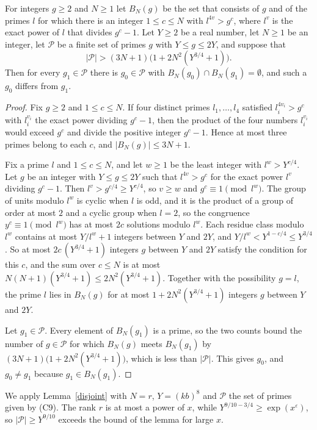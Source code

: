 \begin{lemma}\label{disjoint}
For integers $g\ge2$ and $N\ge1$ let $B_N(g)$ be the set that consists of $g$ and of the primes $l$ for which there is an integer $1\le c\le N$ with $l^{4v}>g^{c}$, where $l^{v}$ is the exact power of $l$ that divides $g^{c}-1$. Let $Y\ge2$ be a real number, let $N\ge1$ be an integer, let $\mathcal P$ be a finite set of primes $g$ with $Y\le g\le2Y$, and suppose that
\[
\lvert\mathcal P\rvert>(3N+1)\big(1+2N^2(Y^{3/4}+1)\big).
\]
Then for every $g_1\in\mathcal P$ there is $g_0\in\mathcal P$ with $B_N(g_0)\cap B_N(g_1)=\emptyset$, and such a $g_0$ differs from $g_1$.
\end{lemma}

\begin{proof}
Fix $g\ge2$ and $1\le c\le N$. If four distinct primes $l_1,\dots,l_4$ satisfied $l_i^{4v_i}>g^{c}$ with $l_i^{v_i}$ the exact power dividing $g^{c}-1$, then the product of the four numbers $l_i^{v_i}$ would exceed $g^{c}$ and divide the positive integer $g^{c}-1$. Hence at most three primes belong to each $c$, and $\lvert B_N(g)\rvert\le3N+1$.

Fix a prime $l$ and $1\le c\le N$, and let $w\ge1$ be the least integer with $l^{w}>Y^{c/4}$. Let $g$ be an integer with $Y\le g\le2Y$ such that $l^{4v}>g^{c}$ for the exact power $l^{v}$ dividing $g^{c}-1$. Then $l^{v}>g^{c/4}\ge Y^{c/4}$, so $v\ge w$ and $g^{c}\equiv1\pmod{l^{w}}$. The group of units modulo $l^{w}$ is cyclic when $l$ is odd, and it is the product of a group of order at most $2$ and a cyclic group when $l=2$, so the congruence $y^{c}\equiv1\pmod{l^{w}}$ has at most $2c$ solutions modulo $l^{w}$. Each residue class modulo $l^{w}$ contains at most $Y/l^{w}+1$ integers between $Y$ and $2Y$, and $Y/l^{w}<Y^{1-c/4}\le Y^{3/4}$. So at most $2c\,(Y^{3/4}+1)$ integers $g$ between $Y$ and $2Y$ satisfy the condition for this $c$, and the sum over $c\le N$ is at most $N(N+1)(Y^{3/4}+1)\le2N^2(Y^{3/4}+1)$. Together with the possibility $g=l$, the prime $l$ lies in $B_N(g)$ for at most $1+2N^2(Y^{3/4}+1)$ integers $g$ between $Y$ and $2Y$.

Let $g_1\in\mathcal P$. Every element of $B_N(g_1)$ is a prime, so the two counts bound the number of $g\in\mathcal P$ for which $B_N(g)$ meets $B_N(g_1)$ by $(3N+1)\big(1+2N^2(Y^{3/4}+1)\big)$, which is less than $\lvert\mathcal P\rvert$. This gives $g_0$, and $g_0\ne g_1$ because $g_1\in B_N(g_1)$.
\end{proof}

We apply Lemma~\ref{disjoint} with $N=r$, $Y=(kb)^8$ and $\mathcal P$ the set of primes given by (C9). The rank $r$ is at most a power of $x$, while $Y^{9/10-3/4}\ge\exp(x^{\varepsilon})$, so $\lvert\mathcal P\rvert\ge Y^{9/10}$ exceeds the bound of the lemma for large $x$.

